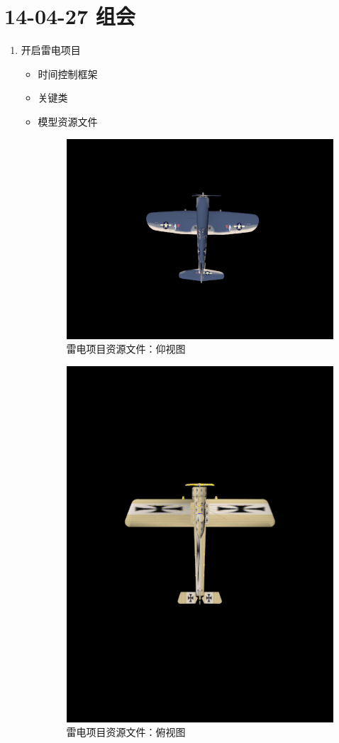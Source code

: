 \documentclass[]{report}
\begin{document}
\section{14-04-27 组会}
\begin{enumerate}
	\item 开启雷电项目
	\begin{itemize}
		\item 时间控制框架
		\item 关键类
		\item 模型资源文件
\begin{figure}
\centering
\includegraphics[width=0.7\linewidth]{./PIC/1}
\caption{雷电项目资源文件：仰视图}
\label{fig:1}
\end{figure}
\begin{figure}
\centering
\includegraphics[width=0.7\linewidth]{./PIC/3}
\caption{雷电项目资源文件：俯视图}
\label{fig:3}
\end{figure}
	\end{itemize}
\end{enumerate}
\end{document}
